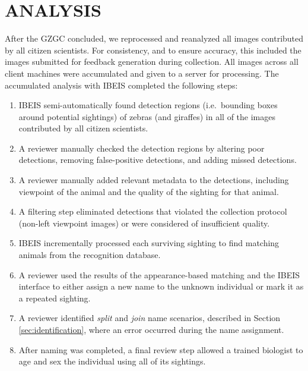 
\chapter{ANALYSIS} \label{sec:analysis}

After the GZGC concluded, we reprocessed and reanalyzed all images contributed by all citizen scientists.  For consistency, and to ensure accuracy, this included the images submitted for feedback generation during collection.   All images across all client machines were accumulated and given to a server for processing.  The accumulated analysis with IBEIS completed the following steps:


\begin{enumerate}
    \item IBEIS semi-automatically found detection regions (i.e.\ bounding boxes around potential sightings) of zebras (and giraffes) in all of the images contributed by all citizen scientists.
    \item A reviewer manually checked the detection regions by altering poor detections, removing false-positive detections, and adding missed detections.
    \item A reviewer manually added relevant metadata to the detections, including viewpoint of the animal and the quality of the sighting for that animal.
    \item A filtering step eliminated detections that violated the collection protocol (non-left viewpoint images) or were considered of insufficient quality.
    \item IBEIS incrementally processed each surviving sighting to find matching animals from the recognition database.
    \item A reviewer used the results of the appearance-based matching and the IBEIS interface to either assign a new name to the unknown individual or mark it as a repeated sighting.
    \item A reviewer identified \textit{split} and \textit{join} name scenarios, described in Section \ref{sec:identification}, where an error occurred during the name assignment.
    \item After naming was completed, a final review step allowed a trained biologist to age and sex the individual using all of its sightings.
\end{enumerate}

